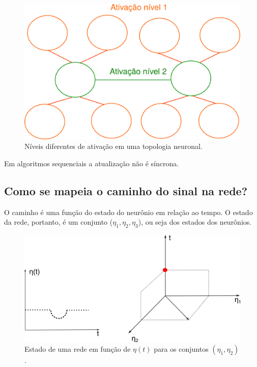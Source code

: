 \begin{figure}[H]
\centering
\includegraphics[width=1\textwidth]{Imagens/Fig13.png}
\caption{Níveis diferentes de ativação em uma topologia neuronal.}
\label{Ativacao}
\end{figure}

Em algoritmos sequenciais a atualização não é síncrona. 

\subsection{Como se mapeia o caminho do sinal na rede?}

O caminho é uma função do estado do neurônio em relação ao tempo. O estado da rede, portanto, é um conjunto ($\eta_{1},\eta_{2},\eta_{3}$), ou seja dos estados dos neurônios.  

\begin{figure}[H]
	\centering
	\includegraphics[width=1\textwidth]{Imagens/Fig14.png}
	\caption{Estado de uma rede em função de $\eta(t)$ para os conjuntos $(\eta_{1},\eta_{2})$.}
	\label{tempo}
\end{figure}

